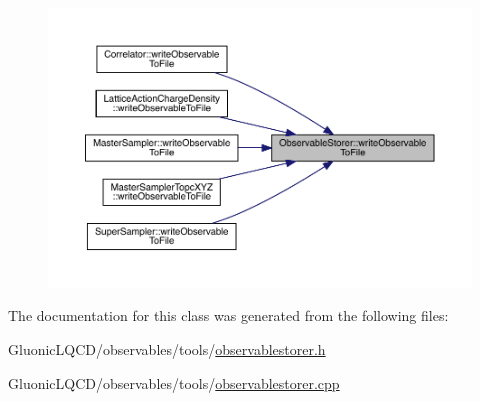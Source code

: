 \begin{figure}[H]
\begin{center}
\leavevmode
\includegraphics[width=350pt]{class_observable_storer_a146f9acb8a0a2ce15782d26bdc4f0bf9_icgraph}
\end{center}
\end{figure}


The documentation for this class was generated from the following files\+:\begin{DoxyCompactItemize}
\item 
Gluonic\+L\+Q\+C\+D/observables/tools/\mbox{\hyperlink{observablestorer_8h}{observablestorer.\+h}}\item 
Gluonic\+L\+Q\+C\+D/observables/tools/\mbox{\hyperlink{observablestorer_8cpp}{observablestorer.\+cpp}}\end{DoxyCompactItemize}
